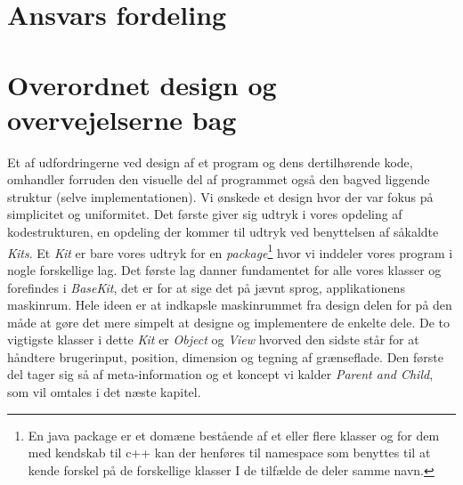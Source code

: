 \documentclass[]{article}
\begin{document}
\section{Ansvars fordeling}

\section{Overordnet design og overvejelserne bag}

Et af udfordringerne ved design af et program og dens dertilhørende kode, omhandler forruden den visuelle del af programmet også den bagved liggende struktur (selve implementationen). Vi ønskede et design hvor der var fokus på simplicitet og uniformitet. Det første giver sig udtryk i vores opdeling af kodestrukturen, en opdeling der kommer til udtryk ved benyttelsen af såkaldte \textit{Kits}. Et \textit{Kit} er bare vores udtryk for en \textit{package}\footnote{En java package er et domæne bestående af et eller flere klasser og for dem med kendskab til c++ kan der henføres til namespace som benyttes til at kende forskel på de forskellige klasser I de tilfælde de deler samme navn.} hvor vi inddeler vores program i nogle forskellige lag. Det første lag danner fundamentet for alle vores klasser og forefindes i \textit{BaseKit}, det er for at sige det på jævnt sprog, applikationens maskinrum. Hele ideen er at indkapsle maskinrummet fra design delen for på den måde at gøre det mere simpelt at designe og implementere de enkelte dele. De to vigtigste klasser i dette \textit{Kit} er \textit{Object} og \textit{View} hvorved den sidste står for at håndtere brugerinput, position, dimension og tegning af grænseflade. Den første del tager sig så af meta-information og et koncept vi kalder \textit{Parent and Child}, som vil omtales i det næste kapitel.
\end{document}
